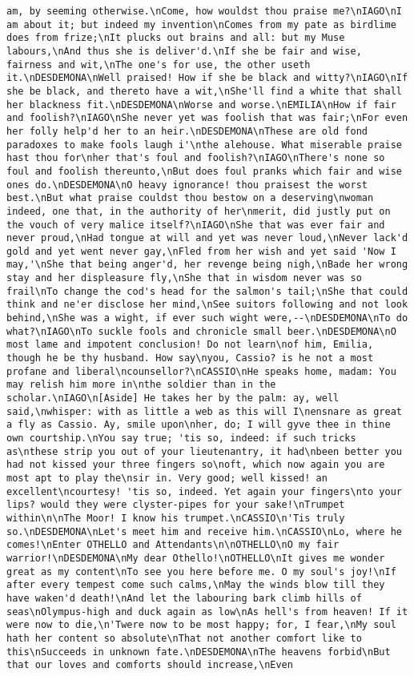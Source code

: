 \begin{verbatim}
am, by seeming otherwise.\nCome, how wouldst thou praise me?\nIAGO\nI am about it; but indeed my invention\nComes from my pate as birdlime does from frize;\nIt plucks out brains and all: but my Muse labours,\nAnd thus she is deliver'd.\nIf she be fair and wise, fairness and wit,\nThe one's for use, the other useth it.\nDESDEMONA\nWell praised! How if she be black and witty?\nIAGO\nIf she be black, and thereto have a wit,\nShe'll find a white that shall her blackness fit.\nDESDEMONA\nWorse and worse.\nEMILIA\nHow if fair and foolish?\nIAGO\nShe never yet was foolish that was fair;\nFor even her folly help'd her to an heir.\nDESDEMONA\nThese are old fond paradoxes to make fools laugh i'\nthe alehouse. What miserable praise hast thou for\nher that's foul and foolish?\nIAGO\nThere's none so foul and foolish thereunto,\nBut does foul pranks which fair and wise ones do.\nDESDEMONA\nO heavy ignorance! thou praisest the worst best.\nBut what praise couldst thou bestow on a deserving\nwoman indeed, one that, in the authority of her\nmerit, did justly put on the vouch of very malice itself?\nIAGO\nShe that was ever fair and never proud,\nHad tongue at will and yet was never loud,\nNever lack'd gold and yet went never gay,\nFled from her wish and yet said 'Now I may,'\nShe that being anger'd, her revenge being nigh,\nBade her wrong stay and her displeasure fly,\nShe that in wisdom never was so frail\nTo change the cod's head for the salmon's tail;\nShe that could think and ne'er disclose her mind,\nSee suitors following and not look behind,\nShe was a wight, if ever such wight were,--\nDESDEMONA\nTo do what?\nIAGO\nTo suckle fools and chronicle small beer.\nDESDEMONA\nO most lame and impotent conclusion! Do not learn\nof him, Emilia, though he be thy husband. How say\nyou, Cassio? is he not a most profane and liberal\ncounsellor?\nCASSIO\nHe speaks home, madam: You may relish him more in\nthe soldier than in the scholar.\nIAGO\n[Aside] He takes her by the palm: ay, well said,\nwhisper: with as little a web as this will I\nensnare as great a fly as Cassio. Ay, smile upon\nher, do; I will gyve thee in thine own courtship.\nYou say true; 'tis so, indeed: if such tricks as\nthese strip you out of your lieutenantry, it had\nbeen better you had not kissed your three fingers so\noft, which now again you are most apt to play the\nsir in. Very good; well kissed! an excellent\ncourtesy! 'tis so, indeed. Yet again your fingers\nto your lips? would they were clyster-pipes for your sake!\nTrumpet within\n\nThe Moor! I know his trumpet.\nCASSIO\n'Tis truly so.\nDESDEMONA\nLet's meet him and receive him.\nCASSIO\nLo, where he comes!\nEnter OTHELLO and Attendants\n\nOTHELLO\nO my fair warrior!\nDESDEMONA\nMy dear Othello!\nOTHELLO\nIt gives me wonder great as my content\nTo see you here before me. O my soul's joy!\nIf after every tempest come such calms,\nMay the winds blow till they have waken'd death!\nAnd let the labouring bark climb hills of seas\nOlympus-high and duck again as low\nAs hell's from heaven! If it were now to die,\n'Twere now to be most happy; for, I fear,\nMy soul hath her content so absolute\nThat not another comfort like to this\nSucceeds in unknown fate.\nDESDEMONA\nThe heavens forbid\nBut that our loves and comforts should increase,\nEven 
\end{verbatim}
